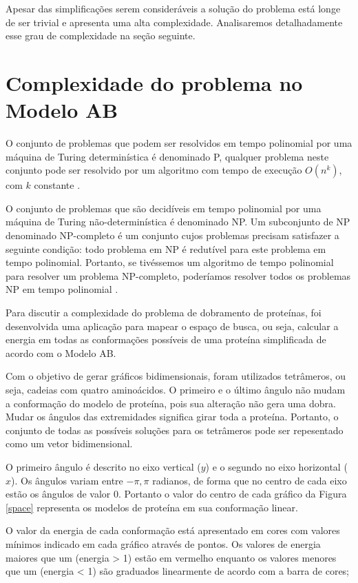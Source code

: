 \documentclass[dm,ppgcomp]{texfurg}
\begin{document}
Apesar das simplificações serem consideráveis a solução do problema está longe de ser trivial e apresenta uma alta complexidade. Analisaremos detalhadamente esse grau de complexidade na seção seguinte.

\section{Complexidade do problema no Modelo AB}

O conjunto de problemas que podem ser resolvidos em tempo polinomial por uma máquina de Turing determinística é denominado P, qualquer problema neste conjunto pode ser resolvido por um algoritmo com tempo de execução $O (n^k)$, com $k$ constante \cite{anderson1986machine}.

O conjunto de problemas que são decidíveis em tempo polinomial por uma máquina de Turing não-determinística é denominado NP. Um subconjunto de NP denominado NP-completo é um conjunto cujos problemas precisam satisfazer a seguinte condição: todo problema em NP é redutível para este problema em tempo polinomial. Portanto, se tivéssemos um algoritmo de tempo polinomial para resolver um problema NP-completo, poderíamos resolver todos os problemas NP em tempo polinomial \cite{fraenkel1993complexity}.

Para discutir a complexidade do problema de dobramento de proteínas, foi desenvolvida uma aplicação para mapear o espaço de busca, ou seja, calcular a energia em todas as conformações possíveis de uma proteína simplificada de acordo com o Modelo AB. 

Com o objetivo de gerar gráficos bidimensionais, foram utilizados tetrâmeros, ou seja, cadeias com quatro aminoácidos. O primeiro e o último ângulo não mudam a conformação do modelo de proteína, pois sua alteração não gera uma dobra. Mudar os ângulos das extremidades significa girar toda a proteína. Portanto, o conjunto de todas as possíveis soluções para os tetrâmeros pode ser repesentado como um vetor bidimensional. 

O primeiro ângulo é descrito no eixo vertical ($y$) e o segundo no eixo horizontal ($x$). Os ângulos variam entre $-\pi, \pi$ radianos, de forma que no centro de cada eixo estão os ângulos de valor 0. Portanto o valor do centro de cada gráfico da Figura \ref{space} representa os modelos de proteína em sua conformação linear. 

O valor da energia de cada conformação está apresentado em cores com valores mínimos indicado em cada gráfico através de pontos. Os valores de energia maiores que um (energia > 1) estão em vermelho enquanto os valores menores que um (energia < 1) são graduados linearmente de acordo com a barra de cores;
\end{document}
